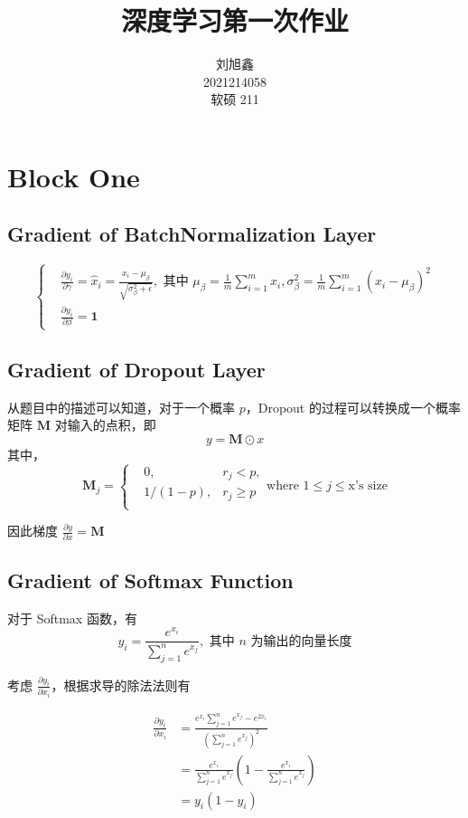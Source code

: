 \documentclass[lang=cn,11pt,a4paper,cite=authoryear]{elegantpaper}
\title{深度学习第一次作业}
\author{刘旭鑫 \\ 2021214058 \\ 软硕 211}
\date{\zhtoday}
\newcommand{\diff}[2]{\frac{\partial #1}{\partial #2}}
\begin{document}
\maketitle
\section{Block One}

\subsection{Gradient of BatchNormalization Layer\label{sec:BN}} 
$$
\left \{
\begin{aligned}
  &\diff{y_i}{\gamma}=\hat{x}_i=\frac{x_i-\mu_\beta}{\sqrt{\sigma_{\beta}^2+\epsilon}}, \text{ 其中 } \mu_\beta = \frac{1}{m}\sum_{i=1}^m x_i, \sigma_{\beta}^2=\frac{1}{m}\sum_{i=1}^m(x_i-\mu_\beta)^2
\\
&\diff{y_i}{\beta}=\mathbf{1}
\end{aligned}
\right .
$$
\subsection{Gradient of Dropout Layer}
从题目中的描述可以知道，对于一个概率 $p$，Dropout 的过程可以转换成一个概率矩阵 $\mathbf{M}$ 对输入的点积，即
$$y=\mathbf{M}\odot x$$
其中，$$
\mathbf{M}_j=\left \{ 
  \begin{aligned}
    & 0, & r_j < p, \\ 
    & 1/(1-p), & r_j \ge p\\
  \end{aligned}
  \right .
  \text{where  1} \le j \le \text{x's size}
$$

因此梯度 $\diff{y}{x}=\mathbf{M}$

\subsection{Gradient of Softmax Function\label{sec:softmax}}
对于 Softmax 函数，有 $$y_i = \frac{e^{x_i}}{\sum_{j=1}^n e^{x_j}}, \text{ 其中 } n \text{ 为输出的向量长度}$$

考虑 $\diff{y_i}{x_i}$，根据求导的除法法则有

$$
\begin{aligned}
\diff{y_i}{x_i}&=\frac{e^{x_i} \sum_{j=1}^n e^{x_j} - e^{2x_i}}{(\sum_{j=1}^n e^{x_j})^2}\\
&=\frac{e^{x_i}}{\sum_{j=1}^n e^{x_j}}(1 - \frac{e^{x_i}}{\sum_{j=1}^n e^{x_j}}) \\
&=y_i(1-y_i)
\end{aligned}
$$
\end{document}
